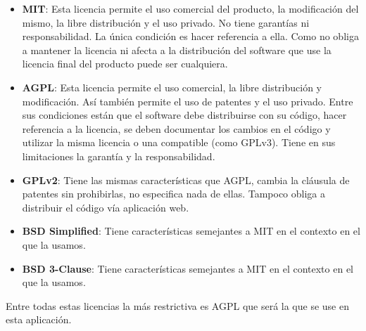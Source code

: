 \begin{itemize}
	\item \textbf{MIT}: Esta licencia permite el uso comercial del producto, la modificación del mismo, la libre distribución y el uso privado. No tiene garantías ni responsabilidad. La única condición es hacer referencia a ella. Como no obliga a mantener la licencia ni afecta a la distribución del software que use la licencia final del producto puede ser cualquiera.
	
	\item \textbf{AGPL}: Esta licencia permite el uso comercial, la libre distribución y modificación. Así también permite el uso de patentes y el uso privado. Entre sus condiciones están que el software debe distribuirse con su código, hacer referencia a la licencia, se deben documentar los cambios en el código y utilizar la misma licencia o una compatible (como GPLv3). Tiene en sus limitaciones la garantía y la responsabilidad.
	
	\item \textbf{GPLv2}: Tiene las mismas características que AGPL, cambia la cláusula de patentes sin prohibirlas, no especifica nada de ellas. Tampoco obliga a distribuir el código vía aplicación web.	
	
	\item \textbf{BSD Simplified}: Tiene características semejantes a MIT en el contexto en el que la usamos.
	
	\item \textbf{BSD 3-Clause}: Tiene características semejantes a MIT en el contexto en el que la usamos.
\end{itemize}

Entre todas estas licencias la más restrictiva es AGPL que será la que se use en esta aplicación.

